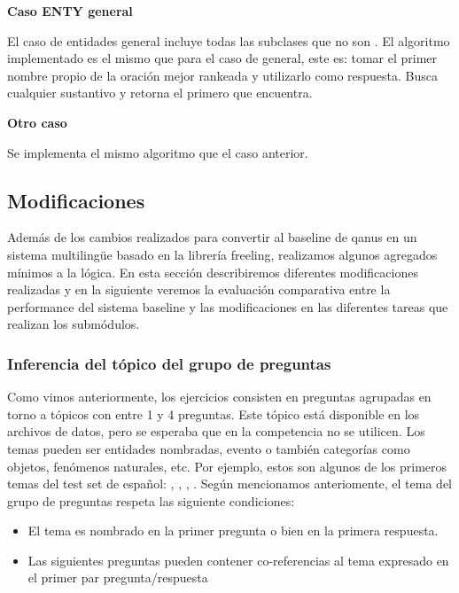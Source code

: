 \textbf{Caso ENTY general} \newline

El caso de entidades general incluye todas las subclases que no son . El algoritmo implementado es el mismo que para el caso de  general, este es: tomar el primer nombre propio de la oración mejor rankeada y utilizarlo como respuesta.
Busca cualquier sustantivo y retorna el primero que encuentra.  \newline

\textbf{Otro caso} \newline

Se implementa el mismo algoritmo que el caso anterior. \newline


\subsection{Modificaciones}

Además de los cambios realizados para convertir al baseline de qanus en un sistema multilingüe basado en la librería freeling, realizamos algunos agregados mínimos a la lógica. En esta sección describiremos diferentes modificaciones realizadas y en la siguiente veremos la evaluación comparativa entre la performance del sistema baseline y las modificaciones en las diferentes tareas que realizan los submódulos. 

\subsubsection{Inferencia del tópico del grupo de preguntas}
\label{subsubsec:entidad-de-grupo}

Como vimos anteriormente, los ejercicios consisten en preguntas agrupadas en torno a tópicos con entre 1 y 4 preguntas. Este tópico está disponible en los archivos de datos, pero se esperaba que en la competencia no se utilicen. Los temas pueden ser entidades nombradas, evento o también categorías como objetos, fenómenos naturales, etc. Por ejemplo, estos son algunos de los primeros temas del test set de español: , , , . Según mencionamos anteriomente, el tema del grupo de preguntas respeta las siguiente condiciones:

\begin{itemize}
\item El tema es nombrado en la primer pregunta o bien en la primera respuesta.
\item Las siguientes preguntas pueden contener co-referencias al tema expresado en el primer par pregunta/respuesta
\end{itemize}

